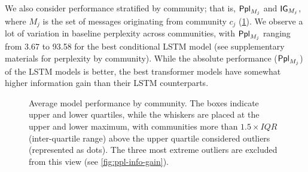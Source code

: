 \documentclass[11pt]{article}
\begin{document}
We also consider performance stratified by community; that is,
$\mathsf{Ppl}_{M_j}$ and $\mathsf{IG}_{M_j}$, 
where $M_j$ is the set of messages originating from community $c_j$ 
(\cref{fig:comm-stratified-box}).
We observe a lot of variation in baseline perplexity
across communities, with $\mathsf{Ppl}_{M_j}$ ranging from \num{3.67} to
\num{93.58} for the best conditional LSTM model 
(see supplementary materials for perplexity by community). %
While the absolute performance ($\mathsf{Ppl}_{M_j}$) of the LSTM models is better,
the best transformer models have somewhat higher information gain
than their LSTM counterparts.


\newcommand{\modelboxplot}[3]{
  \addplot+[
    boxplot={draw position=#3, box extend=0.3}, 
    draw=#2, mark=*, mark options={fill=#2, scale=0.5}, solid, fill=#2!10,
    area legend] 
    table [y=#1] {floats/comm.csv};
}
\begin{figure}[t]
\caption{
  Average model performance by community.
  The boxes indicate upper and lower quartiles, while the whiskers are placed at the upper and lower maximum, with communities more than $1.5\times IQR$ (inter-quartile range) above the upper quartile considered outliers (represented as dots). The three most extreme outliers are excluded from this view (see \cref{fig:ppl-info-gain}).
}
\label{fig:comm-stratified-box}
\end{figure}
\end{document}

